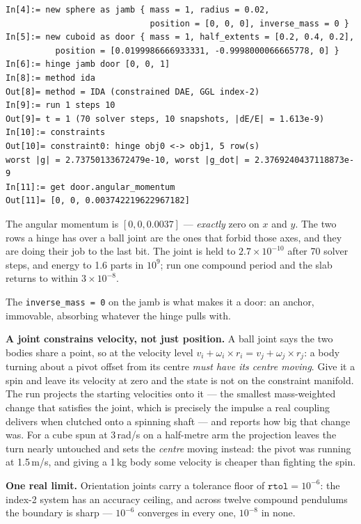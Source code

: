 \documentclass[11pt]{article}
\newcommand{\code}[1]{\texttt{#1}}
\begin{document}
\begin{lstlisting}
In[4]:= new sphere as jamb { mass = 1, radius = 0.02,
                             position = [0, 0, 0], inverse_mass = 0 }
In[5]:= new cuboid as door { mass = 1, half_extents = [0.2, 0.4, 0.2],
          position = [0.0199986666933331, -0.9998000066665778, 0] }
In[6]:= hinge jamb door [0, 0, 1]
In[8]:= method ida
Out[8]= method = IDA (constrained DAE, GGL index-2)
In[9]:= run 1 steps 10
Out[9]= t = 1 (70 solver steps, 10 snapshots, |dE/E| = 1.613e-9)
In[10]:= constraints
Out[10]= constraint0: hinge obj0 <-> obj1, 5 row(s)
worst |g| = 2.73750133672479e-10, worst |g_dot| = 2.3769240437118873e-9
In[11]:= get door.angular_momentum
Out[11]= [0, 0, 0.003742219622967182]
\end{lstlisting}

The angular momentum is $[0, 0, 0.0037]$ --- \emph{exactly} zero on $x$
and $y$. The two rows a hinge has over a ball joint are the ones that
forbid those axes, and they are doing their job to the last bit. The
joint is held to $2.7\times10^{-10}$ after 70 solver steps, and energy to
1.6 parts in $10^{9}$; run one compound period and the slab returns to
within $3\times10^{-8}$.

The \code{inverse\_mass = 0} on the jamb is what makes it a door: an
anchor, immovable, absorbing whatever the hinge pulls with.

\textbf{A joint constrains velocity, not just position.} A ball joint
says the two bodies share a point, so at the velocity level
$v_i + \omega_i\times r_i = v_j + \omega_j\times r_j$: a body turning
about a pivot offset from its centre \emph{must have its centre moving}.
Give it a spin and leave its velocity at zero and the state is not on the
constraint manifold. The run projects the starting velocities onto it ---
the smallest mass-weighted change that satisfies the joint, which is
precisely the impulse a real coupling delivers when clutched onto a
spinning shaft --- and reports how big that change was. For a cube spun
at 3\,rad/s on a half-metre arm the projection leaves the turn nearly
untouched and sets the \emph{centre} moving instead: the pivot was
running at 1.5\,m/s, and giving a 1\,kg body some velocity is cheaper
than fighting the spin.

\textbf{One real limit.} Orientation joints carry a tolerance floor of
$\texttt{rtol}=10^{-6}$: the index-2 system has an accuracy ceiling, and
across twelve compound pendulums the boundary is sharp --- $10^{-6}$
converges in every one, $10^{-8}$ in none.
\end{document}

